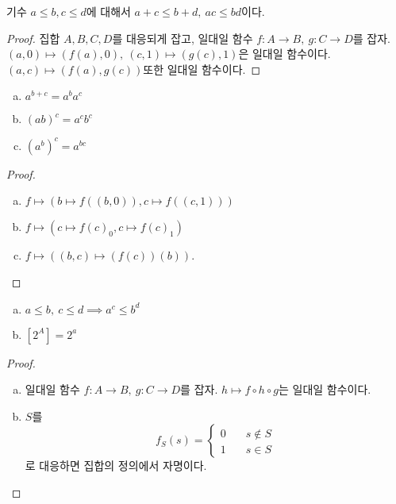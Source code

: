\begin{theorem}
	기수 $a \leq b, c \leq d$에 대해서 $a + c \leq b + d,\: ac \leq bd$이다.
\end{theorem}
\begin{proof}
	집합 $A, B, C, D$를 대응되게 잡고, 일대일 함수 $f : A \to B,\: g : C \to D$를 잡자.
	$(a, 0) \mapsto (f(a), 0),\: (c, 1) \mapsto (g(c), 1)$은 일대일 함수이다.
	$(a, c) \mapsto (f(a), g(c))$또한 일대일 함수이다.
\end{proof}
\begin{theorem}
	\begin{enumerate}[(a)]
		\item $a^{b+c} = a^b a^c$
		\item ${(ab)}^c = a^c b^c$
		\item ${(a^b)}^c = a^{bc}$
	\end{enumerate}
\end{theorem}
\begin{proof}
	\begin{enumerate}[(a)]
		\item $f \mapsto \left(b \mapsto f((b, 0)), c \mapsto f((c, 1)) \right)$
		\item $f \mapsto \left(c \mapsto {f(c)}_0, c \mapsto {f(c)}_1 \right)$
		\item $f \mapsto \left((b, c) \mapsto \left(f(c)\right)(b)\right)$.
	\end{enumerate}
\end{proof}
\begin{theorem}
	\begin{enumerate}[(a)]
		\item $a \leq b,\: c \leq d \implies a^c \leq b^d$
		\item $[2^A]= 2^a$
	\end{enumerate}
\end{theorem}
\begin{proof}
	\begin{enumerate}[(a)]
		\item 일대일 함수 $f: A \to B,\: g : C \to D$를 잡자.
		$h \mapsto f \circ h \circ g$는 일대일 함수이다.
		\item $S$를 \begin{equation}
			f_S(s) = \begin{cases}
				0 \quad &s \not\in S\\
				1 \quad &s \in S
			\end{cases}
		\end{equation}로 대응하면 집합의 정의에서 자명이다.
	\end{enumerate}
\end{proof}
